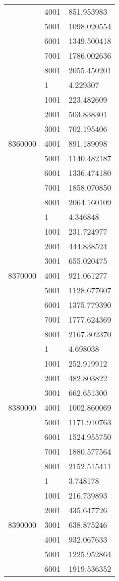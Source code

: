 \begin{table}[htb!]
\begin{tabular}{lll}
 & 4001 & 851.953983 \\
 & 5001 & 1098.020554 \\
 & 6001 & 1349.500418 \\
 & 7001 & 1786.002636 \\
 & 8001 & 2055.450201 \\
\multirow[c]{9}{*}{8360000} & 1 & 4.229307 \\
 & 1001 & 223.482609 \\
 & 2001 & 503.838301 \\
 & 3001 & 702.195406 \\
 & 4001 & 891.189098 \\
 & 5001 & 1140.482187 \\
 & 6001 & 1336.474180 \\
 & 7001 & 1858.070850 \\
 & 8001 & 2064.160109 \\
\multirow[c]{9}{*}{8370000} & 1 & 4.346848 \\
 & 1001 & 231.724977 \\
 & 2001 & 444.838524 \\
 & 3001 & 655.020475 \\
 & 4001 & 921.061277 \\
 & 5001 & 1128.677607 \\
 & 6001 & 1375.779390 \\
 & 7001 & 1777.624369 \\
 & 8001 & 2167.302370 \\
\multirow[c]{9}{*}{8380000} & 1 & 4.698038 \\
 & 1001 & 252.919912 \\
 & 2001 & 482.803822 \\
 & 3001 & 662.651300 \\
 & 4001 & 1002.860069 \\
 & 5001 & 1171.910763 \\
 & 6001 & 1524.955750 \\
 & 7001 & 1880.577564 \\
 & 8001 & 2152.515411 \\
\multirow[c]{9}{*}{8390000} & 1 & 3.748178 \\
 & 1001 & 216.739893 \\
 & 2001 & 435.647726 \\
 & 3001 & 638.875246 \\
 & 4001 & 932.067633 \\
 & 5001 & 1225.952864 \\
 & 6001 & 1919.536352 \\

\end{tabular}
\end{table}
